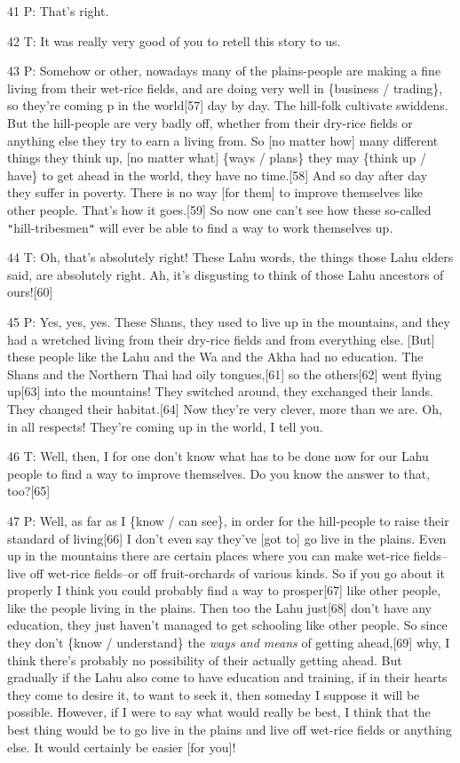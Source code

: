 41 P: That's right.

42 T: It was really very good of you to retell this story to us.

43 P: Somehow or other, nowadays many of the plains-people are making a fine living
from their wet-rice fields, and are doing very well in \{business / trading\},
so they're coming p in the world[57] day by day. The hill-folk cultivate swiddens.
But the hill-people are very badly off, whether from their dry-rice fields or anything
else they try to earn a living from. So [no matter how] many different things they
think up, [no matter what] \{ways / plans\} they may \{think up / have\} to get
ahead in the world, they have no time.[58] And so day after day they suffer in
poverty. There is no way [for them] to improve themselves like other people. That's
how it goes.[59] So now one can't see how these so-called \texttt{"}hill-tribesmen\texttt{"}
will ever be able to find a way to work themselves up.

44 T: Oh, that's absolutely right! These Lahu words, the things those Lahu elders
said, are absolutely right. Ah, it's disgusting to think of those Lahu ancestors
of ours![60]

45 P: Yes, yes, yes. These Shans, they used to live up in the mountains, and they
had a wretched living from their dry-rice fields and from everything else. [But]
these people like the Lahu and the Wa and the Akha had no education. The Shans
and the Northern Thai had oily tongues,[61] so the others[62] went flying up[63]
into the mountains! They switched around, they exchanged their lands. They changed
their habitat.[64] Now they're very clever, more than we are. Oh, in all respects!
They're coming up in the world, I tell you.

46 T: Well, then, I for one don't know what has to be done now for our Lahu people
to find a way to improve themselves. Do you know the answer to that, too?[65]

47 P: Well, as far as I \{know / can see\}, in order for the hill-people to raise
their standard of living[66] I don't even say they've [got to] go live in the plains.
Even up in the mountains there are certain places where you can make wet-rice fields--live
off wet-rice fields--or off fruit-orchards of various kinds. So if you go about
it properly I think you could probably find a way to prosper[67] like other people,
like the people living in the plains. Then too the Lahu just[68] don't have any
education, they just haven't managed to get schooling like other people. So since
they don't \{know / understand\} the \textit{ways and means} of getting ahead,[69]
why, I think there's probably no possibility of their actually getting ahead. But
gradually if the Lahu also come to have education and training, if in their hearts
they come to desire it, to want to seek it, then someday I suppose it will be possible.
However, if I were to say what would really be best, I think that the best thing
would be to go live in the plains and live off wet-rice fields or anything else.
It would certainly be easier [for you]!

